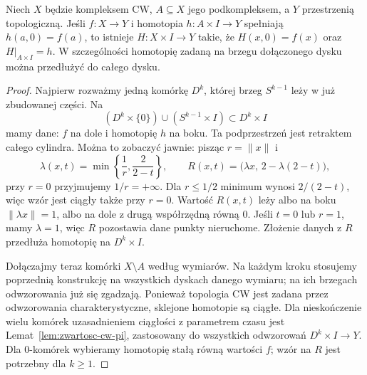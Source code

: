 \begin{lemat}
\label{lem:hep-cw}
Niech $X$ będzie kompleksem CW, $A\subseteq X$
jego podkompleksem, a $Y$ przestrzenią topologiczną.
Jeśli $f:X\to Y$ i homotopia
$h:A\times I\to Y$ spełniają
$h(a,0)=f(a)$, to istnieje
$H:X\times I\to Y$ takie, że
$H(x,0)=f(x)$ oraz $H|_{A\times I}=h$.
W szczególności homotopię
zadaną na brzegu dołączonego
dysku można przedłużyć do
całego dysku.
\end{lemat}
\begin{proof}
Najpierw rozważmy jedną komórkę
$D^k$, której brzeg $S^{k-1}$
leży w już zbudowanej części.
Na
\[
 (D^k\times\{0\})\cup
 (S^{k-1}\times I)
\subset D^k\times I
\]
mamy dane: $f$ na dole
i homotopię $h$ na boku.
Ta podprzestrzeń jest
retraktem całego cylindra.
Można to zobaczyć jawnie:
pisząc $r=\|x\|$ i
\[
 \lambda(x,t)=
 \min\left\{\frac1r,\frac2{2-t}\right\},
 \qquad
 R(x,t)=\bigl(\lambda x,\,
                  2-\lambda(2-t)\bigr),
\]
przy $r=0$ przyjmujemy
$1/r=+\infty$. Dla $r\leq1/2$ minimum wynosi $2/(2-t)$,
więc wzór jest ciągły także przy $r=0$. Wartość
$R(x,t)$ leży albo na boku
$\|\lambda x\|=1$, albo
na dole z drugą współrzędną
równą $0$. Jeśli $t=0$
lub $r=1$, mamy $\lambda=1$,
więc $R$ pozostawia dane
punkty nieruchome.
Złożenie danych z $R$
przedłuża homotopię
na $D^k\times I$.

Dołączajmy teraz komórki
$X\setminus A$ według
wymiarów. Na każdym kroku
stosujemy poprzednią
konstrukcję na wszystkich
dyskach danego wymiaru;
na ich brzegach odwzorowania
już się zgadzają. Ponieważ
topologia CW jest zadana
przez odwzorowania charakterystyczne,
sklejone homotopie są
ciągłe. Dla nieskończenie wielu komórek uzasadnieniem ciągłości
z parametrem czasu jest Lemat~\ref{lem:zwartosc-cw-pi},
zastosowany do wszystkich odwzorowań $D^k\times I\to Y$.
Dla $0$-komórek wybieramy homotopię stałą równą wartości $f$;
wzór na $R$ jest potrzebny dla $k\geq1$.
\end{proof}

